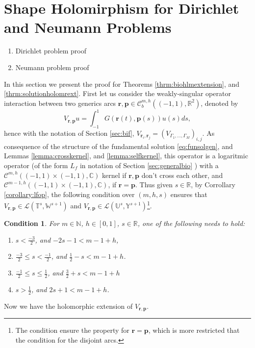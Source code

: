 \documentclass{article}
\newtheorem{condition}[theorem]{Condition}
\newcommand{\IC}{{\mathbb C}}
\newcommand{\IN}{{\mathbb N}}
\newcommand{\IR}{{\mathbb R}}
\newcommand{\IU}{{\mathbb U}}
\newcommand{\IT}{{\mathbb T}}
\newcommand{\IW}{{\mathbb W}}
\newcommand{\IY}{{\mathbb Y}}
\newcommand{\bp}{{\bm p}}
\newcommand{\cmspaceh}[4]{\mathcal{C}^{#1,#2} \left( #3, #4 \right)}
\newcommand{\rgeoh}[2]{\mathcal{C}_b^{#1,#2}\left( (-1,1), \IR^2 \right)}
\newcommand{\br}{\bm{r}}
\newcommand{\iinterv}{(-1,1)\times(-1,1)}
\begin{document}
\section{Shape Holomirphism for Dirichlet and Neumann Problems}
\begin{enumerate}
\item 
Dirichlet problem proof
\item 
Neumann problem proof 
\end{enumerate}

In this section we present the proof for Theorems \ref{thrm:biohlmextension}, and \ref{thrm:solutionholomrext}. First let us consider the weakly-singular operator interaction between two generics arcs $\br,\bp \in \rgeoh{m}{h}$, denoted by 
$$V_{\br,\bp}u  = \int_{-1}^1G(\br(t),\bp(s)) u(s) ds,$$
hence with the notation of Section \ref{sec:bif}, $V_{\br_i, \br_j} = (V_{\Gamma_1,\hdots,\Gamma_M})_{i,j}$. As consequence of the structure of the fundamental solution \eqref{eq:funsolgen}, and Lemmas \ref{lemma:crosskernel}, and \ref{lemma:selfkernel}, this operator is a logaritmic operator (of the form $L_f$ in notation of Section \ref{sec:generalbio} ) with a $\cmspaceh{m}{h}{\iinterv}{\IC}$ kernel if $\br ,\bp$ don't cross each other, and $\cmspaceh{m-1}{h}{\iinterv}{\IC}$, if $\br = \bp$. Thus given $s \in \IR$,   by Corrollary \ref{corollary:lfop}, the following condition over $(m,h,s)$ ensures that $V_{\br,\bp} \in \mathcal{L}\left(\IT^s,\IW^{s+1}\right)$ and $V_{\br,\bp} \in \mathcal{L}\left(\IU^s,\IY^{s+1}\right)$\footnote{The condition ensure the property for $\br = \bp$, which is more restricted that the condition for the disjoint arcs.}.
\begin{condition}
\label{condition:smh}
For $m \in \IN$, $h \in [0,1]$, $s \in \IR$, one of the following needs to hold:
\begin{enumerate}
\item[i] 
$s < \frac{-3}{2}$, and $-2s-1<m-1+h$,
\item[ii] 
$\frac{-3}{2} \leq s < \frac{-1}{2}$, and $\frac{1}{2} -s < m-1+h$.
\item[iii] 
$\frac{-1}{2} \leq s \leq \frac{1}{2}$, and $\frac{3}{2}+s< m-1 +h$
\item[iv] 
$s> \frac{1}{2}$, and $2s +1 < m -1 +h $.
\end{enumerate}
\end{condition}
Now we have the holomorphic extension of $V_{\br,\bp}$.
\end{document}

